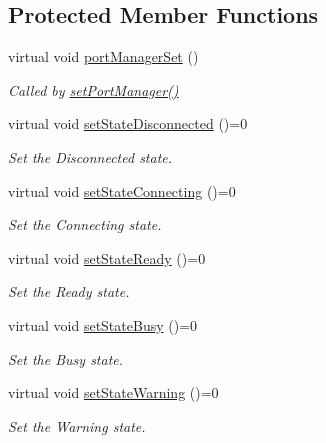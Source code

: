 \subsection*{Protected Member Functions}
\begin{DoxyCompactItemize}
\item 
virtual void \hyperlink{classmdt_abstract_port_setup_dialog_a3393de371465c1e278711b5b2fd8d2c2}{portManagerSet} ()
\begin{DoxyCompactList}\small\item\em Called by \hyperlink{classmdt_abstract_port_setup_dialog_a016ab988e47c7702a9400985eb95fbc5}{setPortManager()} \end{DoxyCompactList}\item 
virtual void \hyperlink{classmdt_abstract_port_setup_dialog_a6943bd9ed9fd9678c256b54c44d7227c}{setStateDisconnected} ()=0
\begin{DoxyCompactList}\small\item\em Set the Disconnected state. \end{DoxyCompactList}\item 
virtual void \hyperlink{classmdt_abstract_port_setup_dialog_af0b938b1b8c3567c03feb02ba71307d4}{setStateConnecting} ()=0
\begin{DoxyCompactList}\small\item\em Set the Connecting state. \end{DoxyCompactList}\item 
virtual void \hyperlink{classmdt_abstract_port_setup_dialog_aac277958ac97ad7ad94135e0d152b732}{setStateReady} ()=0
\begin{DoxyCompactList}\small\item\em Set the Ready state. \end{DoxyCompactList}\item 
virtual void \hyperlink{classmdt_abstract_port_setup_dialog_ae69fe60533e2df56f790e2522bb81592}{setStateBusy} ()=0
\begin{DoxyCompactList}\small\item\em Set the Busy state. \end{DoxyCompactList}\item 
virtual void \hyperlink{classmdt_abstract_port_setup_dialog_a0c337beb9880709807900d0eed73e9bb}{setStateWarning} ()=0
\begin{DoxyCompactList}\small\item\em Set the Warning state. \end{DoxyCompactList}\item 

\end{DoxyCompactItemize}
